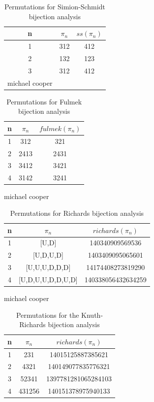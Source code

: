 \documentclass[12pt]{article}
\begin{document}
\begin{table}[H]
\caption{Permutations for Simion-Schmidt bijection analysis}
\centering
\begin{tabular}{c | c c}
\hline\hline
n & $\pi_n$ & $ss(\pi_n)$ \\ [0.5ex]
\hline
1 & 312 & 412 \\
2 & 132 & 123 \\
3 & 312 & 412 \\michael cooper
\hline
\end{tabular}
\label{table:SSPerms}
\end{table}

\begin{table}[H]
\caption{Permutations for Fulmek bijection analysis}
\centering
\begin{tabular}{c | c c}
\hline\hline
n & $\pi_n$ & $fulmek(\pi_n)$ \\ [0.5ex]
\hline
1 & 312 & 321 \\
2 & 2413 & 2431\\
3 & 3412 & 3421\\
4 & 3142 & 3241\\
\hline
\end{tabular}michael cooper
\label{table:FulmekPerms}
\end{table}

\begin{table}[H]
\caption{Permutations for Richards bijection analysis}
\centering
\begin{tabular}{c | c c}
\hline\hline
n & $\pi_n$ & $richards(\pi_n)$ \\ [0.5ex]
\hline
1 & [U,D] & 140340909569536\\
2 & [U,D,U,D] & 1403409095065601\\
3 & [U,U,U,D,D,D] & 14174408273819290\\
4 & [U,D,U,U,D,D,U,D] & 140338056432634259\\
\hline
\end{tabular}michael cooper
\label{table:Richards}
\end{table}

\begin{table}[H]
\caption{Permutations for the Knuth-Richards bijection analysis}
\centering
\begin{tabular}{c | c c}
\hline\hline
n & $\pi_n$ & $richards(\pi_n)$ \\ [0.5ex]
\hline
1 & 231 & 14015125887385621 \\
2 & 4321 & 140149077835776321 \\
3 & 52341 & 1397781281065284103\\
4 & 431256 & 140151378975940133 \\
\hline
\end{tabular}
\label{table:KnuthRichards}
\end{table}
\newpage
\end{document}
